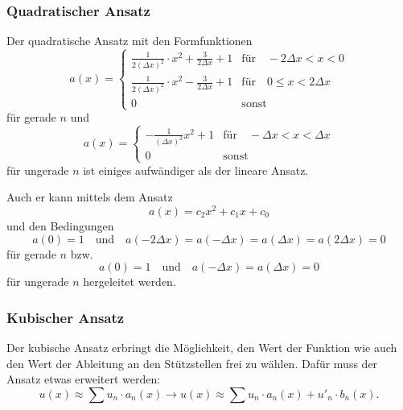 \subsubsection{Quadratischer Ansatz}
Der quadratische Ansatz mit den Formfunktionen
\begin{equation}
    a(x) = \left\{ \begin{array}{ll}
        \frac{1}{2(\Delta x)^2} \cdot x^2 + \frac{3}{2 \Delta x} + 1  & \text{für} \quad -2 \Delta x < x < 0 \\
        \frac{1}{2(\Delta x)^2} \cdot x^2 - \frac{3}{2 \Delta x} + 1 & \text{für} \quad 0 \leq x < 2 \Delta x \\
        0                                                             & \text{sonst}
    \end{array} \right.
\end{equation}
für gerade $n$ und
\begin{equation}
    a(x) = \left\{ \begin{array}{ll}
        -\frac{1}{(\Delta x)^2} x^2 + 1 & \text{für} \quad -\Delta x < x < \Delta x \\
        0            & \text{sonst}
    \end{array} \right.
\end{equation}
für ungerade $n$ ist einiges aufwändiger als der lineare Ansatz.

Auch er kann mittels dem Ansatz 
\begin{equation}
    a(x) = c_2x^2 + c_1x + c_0
\end{equation}
und den Bedingungen 
\begin{equation}
        a(0) = 1 \quad
        \text{und} \quad 
        a(-2 \Delta x) = a(-\Delta x) = a(\Delta x) = a(2 \Delta x) = 0
\end{equation}
für gerade $n$ bzw.
\begin{equation}
        a(0) = 1 \quad
        \text{und} \quad
        a(-\Delta x) = a(\Delta x) = 0
\end{equation}
für ungerade $n$ hergeleitet werden.

\subsubsection{Kubischer Ansatz}
Der kubische Ansatz erbringt die Möglichkeit, den Wert der Funktion wie auch den Wert der Ableitung an den Stützstellen frei zu wählen.
Dafür muss der Ansatz etwas erweitert werden:
\begin{equation}
    u(x) \approx \sum{u_n \cdot a_n(x)} \rightarrow u(x) \approx \sum{u_n \cdot a_n(x) + u'_n \cdot b_n(x)}.
\end{equation}

